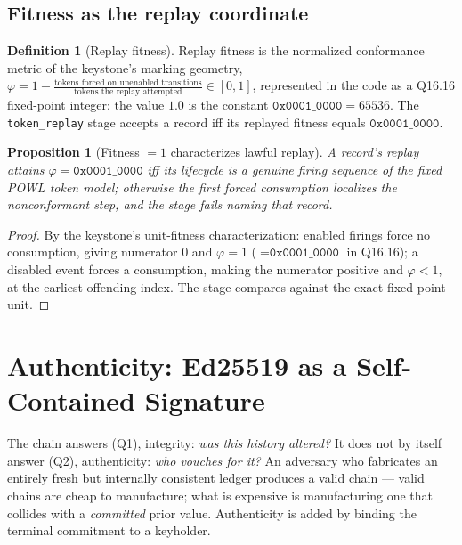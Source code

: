 \documentclass[11pt,oneside]{book}
\theoremstyle{definition}
\newtheorem{definition}{Definition}[chapter]
\theoremstyle{plain}
\newtheorem{proposition}[theorem]{Proposition}
\theoremstyle{remark}
\newcommand{\Fitness}{\varphi}
\newcommand{\code}[1]{\texttt{#1}}
\begin{document}
\section{Fitness as the replay coordinate}
\label{sec:fitness}

\begin{definition}[Replay fitness]\label{def:fitness}
Replay fitness is the normalized conformance metric of the keystone's marking geometry, $\Fitness=1-\frac{\text{tokens forced on unenabled transitions}}{\text{tokens the replay attempted}}\in[0,1]$, represented in the code as a Q16.16 fixed-point integer: the value $1.0$ is the constant $\code{0x0001\_0000}=65536$. %
The \code{token\_replay} stage accepts a record iff its replayed fitness equals $\code{0x0001\_0000}$. %
\end{definition}

\begin{proposition}[Fitness $=1$ characterizes lawful replay]\label{prop:fitness}
A record's replay attains $\Fitness=\code{0x0001\_0000}$ iff its lifecycle is a genuine firing sequence of the fixed POWL token model; otherwise the first forced consumption localizes the nonconformant step, and the stage fails naming that record. %
\end{proposition}

\begin{proof}
By the keystone's unit-fitness characterization: enabled firings force no consumption, giving numerator $0$ and $\Fitness=1$ ($=\code{0x0001\_0000}$ in Q16.16); a disabled event forces a consumption, making the numerator positive and $\Fitness<1$, at the earliest offending index. %
The stage compares against the exact fixed-point unit. %
\end{proof} %

\chapter{Authenticity: Ed25519 as a Self-Contained Signature}
\label{ch:auth}

The chain answers (Q1), integrity: \emph{was this history altered?} It does not by itself answer (Q2), authenticity: \emph{who vouches for it?} An adversary who fabricates an entirely fresh but internally consistent ledger produces a valid chain --- valid chains are cheap to manufacture; what is expensive is manufacturing one that collides with a \emph{committed} prior value. %
Authenticity is added by binding the terminal commitment to a keyholder. %
\end{document}
